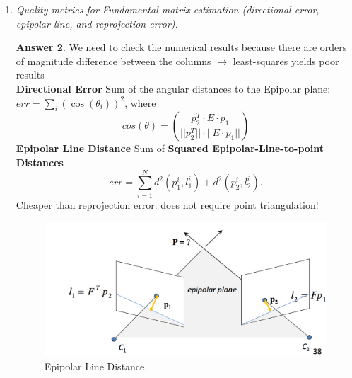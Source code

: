 \documentclass[a4paper,12 pt]{article}
\theoremstyle{definition}
\theoremstyle{remark}
\theoremstyle{definition}
\theoremstyle{definition}
\theoremstyle{definition}
\theoremstyle{definition}
\theoremstyle{remark}
\theoremstyle{remark}
\theoremstyle{definition}
\theoremstyle{definition}
\newtheorem*{answer}{Answer}
\begin{document}
\begin{enumerate}
\begin{answer}
\begin{enumerate}
\item Estimate $\hat{F}$ using normalized coordinates $\hat{p}_1,\hat{p}_2$.
\item Compute $F$ from $\hat{F}:$
\begin{equation}
\begin{split}
\hat{p}_2^T\cdot \hat{F}\cdot \hat{p}_1&=0\\
 p_2^{T}\cdot B_2^T\cdot \hat{F}\ \cdot B_1\cdot p_1&=0\\
\Rightarrow F&=B_2^T\cdot \hat{F}\cdot B_1
\end{split}
\end{equation}
A valid fundamental matrix must have $\# $ rank =  $\# $ points and hence det(F)=0 
\end{enumerate}
\end{answer}
\item \textit{Quality metrics for Fundamental matrix estimation (directional error, epipolar line, and reprojection error).}
\begin{answer} We need to check the numerical results because there are orders of magnitude difference
between the columns  $\rightarrow$ least-squares yields poor results\\
\textbf{Directional Error}
Sum of the angular distances to the Epipolar plane: $err=\sum_i (\cos(\theta_i))^2$, where
\begin{equation}
cos(\theta)=\left(\frac{p_2^T\cdot E \cdot p_1}{||p_2^T||\cdot ||E\cdot p_1||} \right)
\end{equation}
\textbf{Epipolar Line Distance}
Sum of \textbf{Squared Epipolar-Line-to-point Distances}
\begin{equation}
err=\sum_{i=1}^Nd^2(p_1^i,l_1^i)+d^2(p_2^i,l_2^i).
\end{equation}
Cheaper than reprojection error: does not require point triangulation!
\begin{figure}[h!]
\begin{center}
\includegraphics[scale=0.2]{pics/epi_line}
\caption{Epipolar Line Distance. \label{fig:epi_line}}
\end{center}
\end{figure}

\end{answer}
\end{enumerate}
\end{document}
